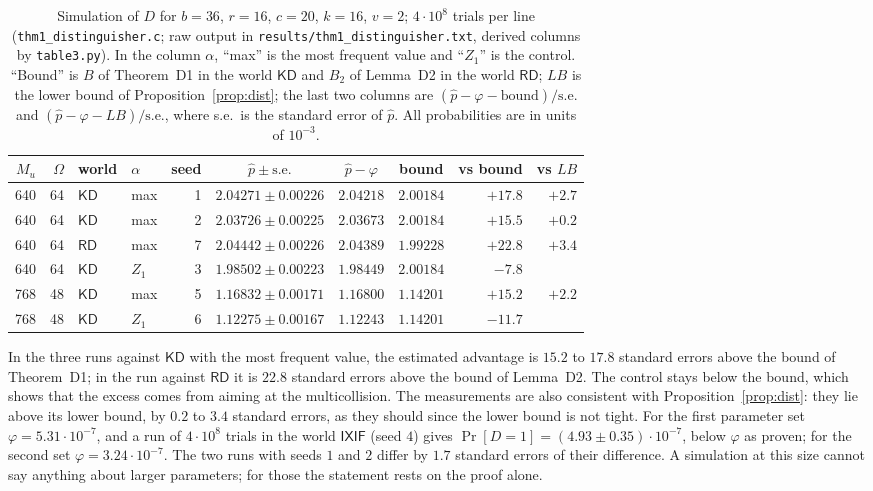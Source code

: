 \documentclass[11pt,a4paper]{article}
\theoremstyle{definition}
\theoremstyle{remark}
\newcommand{\KD}{\mathsf{KD}}
\newcommand{\RD}{\mathsf{RD}}
\newcommand{\IXIF}{\mathsf{IXIF}}
\newcommand{\file}[1]{\texttt{#1}}
\begin{document}
\begin{table}[ht]
\centering
\caption{Simulation of $D$ for $b = 36$, $r = 16$, $c = 20$, $k = 16$, $v = 2$; $4 \cdot 10^8$ trials per line
(\file{thm1\_distinguisher.c}; raw output in \file{results/thm1\_distinguisher.txt}, derived columns by \file{table3.py}).
In the column $\alpha$, ``max'' is the most frequent value and ``$Z_1$'' is the control. ``Bound'' is $B$ of Theorem~D1 in the world $\KD$ and $B_2$ of Lemma~D2 in the world $\RD$; $\mathit{LB}$ is the lower bound
of Proposition~\ref{prop:dist}; the last two columns are $(\hat p - \varphi - \text{bound})/\text{s.e.}$ and
$(\hat p - \varphi - \mathit{LB})/\text{s.e.}$, where s.e.\ is the standard error of $\hat p$. All probabilities are in units of $10^{-3}$.}\label{tab:sim}
\smallskip
\small
\setlength{\tabcolsep}{4pt}
\begin{tabular}{rrllrcccrr}
\toprule
$M_u$ & $\Omega$ & world & $\alpha$ & seed & $\hat p \pm \text{s.e.}$ & $\hat p - \varphi$ & bound & vs bound & vs $\mathit{LB}$ \\
\midrule
640 & 64 & $\KD$ & max & 1 & $2.04271 \pm 0.00226$ & $2.04218$ & $2.00184$ & $+17.8$ & $+2.7$ \\
640 & 64 & $\KD$ & max & 2 & $2.03726 \pm 0.00225$ & $2.03673$ & $2.00184$ & $+15.5$ & $+0.2$ \\
640 & 64 & $\RD$ & max & 7 & $2.04442 \pm 0.00226$ & $2.04389$ & $1.99228$ & $+22.8$ & $+3.4$ \\
640 & 64 & $\KD$ & $Z_1$ & 3 & $1.98502 \pm 0.00223$ & $1.98449$ & $2.00184$ & $-7.8$ & \\
768 & 48 & $\KD$ & max & 5 & $1.16832 \pm 0.00171$ & $1.16800$ & $1.14201$ & $+15.2$ & $+2.2$ \\
768 & 48 & $\KD$ & $Z_1$ & 6 & $1.12275 \pm 0.00167$ & $1.12243$ & $1.14201$ & $-11.7$ & \\
\bottomrule
\end{tabular}
\end{table}

In the three runs against $\KD$ with the most frequent value, the estimated advantage is $15.2$ to $17.8$ standard errors
above the bound of Theorem~D1; in the run against $\RD$ it is $22.8$ standard errors above the bound of Lemma~D2. The
control stays below the bound, which shows that the excess comes from aiming at the multicollision. The measurements
are also consistent with Proposition~\ref{prop:dist}: they lie above its lower bound, by $0.2$ to $3.4$ standard errors,
as they should since the lower bound is not tight. For the first parameter set $\varphi = 5.31 \cdot 10^{-7}$, and a run of
$4 \cdot 10^8$ trials in the world $\IXIF$ (seed $4$) gives $\Pr[D = 1] = (4.93 \pm 0.35) \cdot 10^{-7}$, below $\varphi$ as proven; for the second
set $\varphi = 3.24 \cdot 10^{-7}$. The two runs with seeds $1$ and $2$ differ by $1.7$ standard errors of their difference.
A simulation at this size cannot say anything about larger parameters; for those the statement rests on the proof alone.
\end{document}
